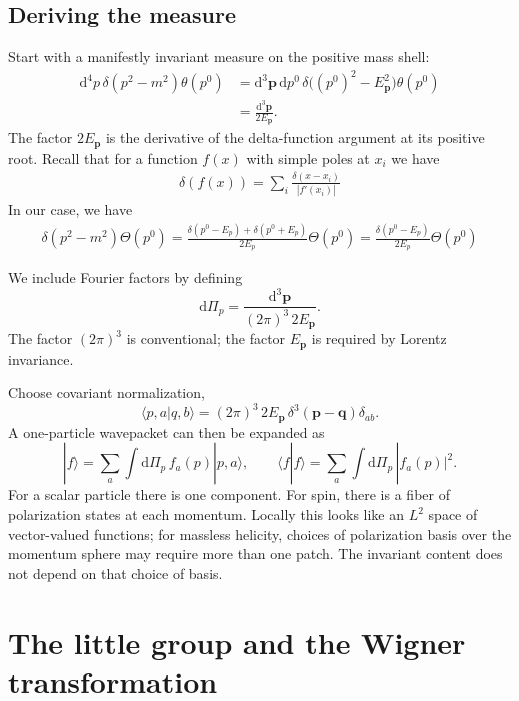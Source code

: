 \documentclass[11pt]{article}
\newcommand{\dd}{\mathrm{d}}
\begin{document}
\subsection{Deriving the measure}
Start with a manifestly invariant measure on the positive mass shell:
\begin{align}
 \dd^4p\,\delta(p^2-m^2)\theta(p^0)
 &=\dd^3\bm p\,\dd p^0\,
   \delta\big((p^0)^2-E_{\bm p}^2\big)\theta(p^0)\nonumber\\
 &=\frac{\dd^3\bm p}{2E_{\bm p}}.
 \label{eq:measurederive}
\end{align}
The factor \(2E_{\bm p}\) is the derivative of the delta-function
argument at its positive root. Recall that for a function $f(x)$ with simple poles at $x_i$ we have
\begin{align}
    \delta(f(x))=\sum_i \frac{\delta(x-x_i)}{|f'(x_i)|}
\end{align}
In our case, we have
\begin{align}
    \delta(p^2-m^2)\Theta(p^0)=\frac{\delta(p^0-E_p)+\delta(p^0+E_p)}{2E_p}\Theta(p^0)=\frac{\delta(p^0-E_p)}{2E_p}\Theta(p^0)
\end{align}



We include Fourier factors by defining
\begin{equation}
 \dd\Pi_p=\frac{\dd^3\bm p}{(2\pi)^3\,2E_{\bm p}}.
 \label{eq:measure}
\end{equation}
The factor \((2\pi)^3\) is conventional; the factor \(E_{\bm p}\)
is required by Lorentz invariance.

Choose covariant normalization,
\begin{equation}
 \langle p,a|q,b\rangle
   =(2\pi)^3\,2E_{\bm p}\,\delta^3(\bm p-\bm q)\delta_{ab}.
 \label{eq:ketnorm}
\end{equation}
A one-particle wavepacket can then be expanded as
\begin{equation}
 |f\rangle=\sum_a\int\dd\Pi_p\,f_a(p)|p,a\rangle,
 \qquad
 \langle f|f\rangle=\sum_a\int\dd\Pi_p\,|f_a(p)|^2.
 \label{eq:wavepacket}
\end{equation}
For a scalar particle there is one component. For spin, there is a
fiber of polarization states at each momentum. Locally this looks
like an \(L^2\) space of vector-valued functions; for massless helicity,
choices of polarization basis over the momentum sphere may require
more than one patch. The invariant content does not depend on that
choice of basis.

\section{The little group and the Wigner transformation}
\end{document}
